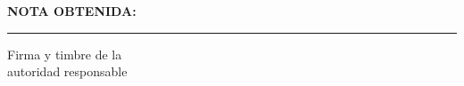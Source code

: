 \thispagestyle{fancy}

\vspace*{0.6 cm}

\begin{flushright}
\begin{minipage}{7.5cm}
    \centering

    {\Large\textbf{NOTA OBTENIDA:}}

    \vspace{3cm}

    \rule{7cm}{0.4pt}

    \vspace{0.4cm}

    {\large Firma y timbre de la}\\
    {\large autoridad responsable}
\end{minipage}
\end{flushright}